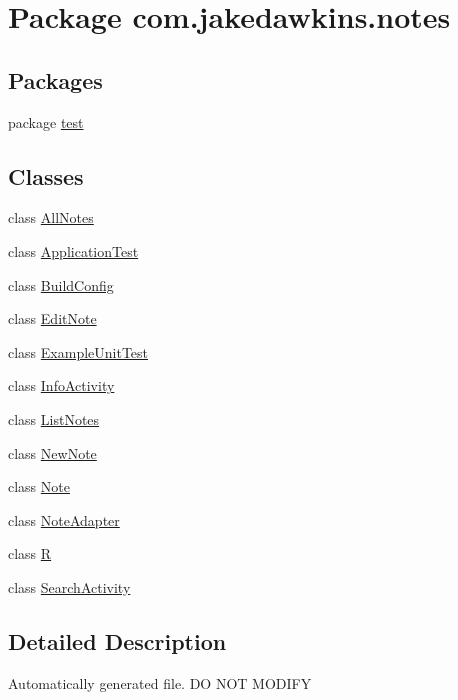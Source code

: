 \hypertarget{namespacecom_1_1jakedawkins_1_1notes}{}\section{Package com.\+jakedawkins.\+notes}
\label{namespacecom_1_1jakedawkins_1_1notes}
\subsection*{Packages}
\begin{DoxyCompactItemize}
\item 
package \hyperlink{namespacecom_1_1jakedawkins_1_1notes_1_1test}{test}
\end{DoxyCompactItemize}
\subsection*{Classes}
\begin{DoxyCompactItemize}
\item 
class \hyperlink{classcom_1_1jakedawkins_1_1notes_1_1_all_notes}{All\+Notes}
\item 
class \hyperlink{classcom_1_1jakedawkins_1_1notes_1_1_application_test}{Application\+Test}
\item 
class \hyperlink{classcom_1_1jakedawkins_1_1notes_1_1_build_config}{Build\+Config}
\item 
class \hyperlink{classcom_1_1jakedawkins_1_1notes_1_1_edit_note}{Edit\+Note}
\item 
class \hyperlink{classcom_1_1jakedawkins_1_1notes_1_1_example_unit_test}{Example\+Unit\+Test}
\item 
class \hyperlink{classcom_1_1jakedawkins_1_1notes_1_1_info_activity}{Info\+Activity}
\item 
class \hyperlink{classcom_1_1jakedawkins_1_1notes_1_1_list_notes}{List\+Notes}
\item 
class \hyperlink{classcom_1_1jakedawkins_1_1notes_1_1_new_note}{New\+Note}
\item 
class \hyperlink{classcom_1_1jakedawkins_1_1notes_1_1_note}{Note}
\item 
class \hyperlink{classcom_1_1jakedawkins_1_1notes_1_1_note_adapter}{Note\+Adapter}
\item 
class \hyperlink{classcom_1_1jakedawkins_1_1notes_1_1_r}{R}
\item 
class \hyperlink{classcom_1_1jakedawkins_1_1notes_1_1_search_activity}{Search\+Activity}
\end{DoxyCompactItemize}


\subsection{Detailed Description}
Automatically generated file. DO N\+OT M\+O\+D\+I\+FY 